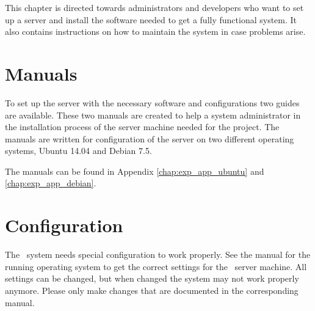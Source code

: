 This chapter is directed towards administrators and developers who want to
set up a server and install the software needed to get a fully functional system.
It also contains instructions on how to maintain the system in case problems arise.
\section{Manuals}
To set up the server with the necessary software and configurations two guides are available. These two manuals are created to help a system administrator in the installation process of the server machine needed for the project. The manuals are written for configuration of the server on two different operating systems, Ubuntu 14.04 and Debian 7.5. 

The manuals can be found in Appendix \ref{chap:exp_app_ubuntu} and \ref{chap:exp_app_debian}.

\section{Configuration}
The \appName\ system needs special configuration to work properly. See the manual for the running operating system to get the correct settings for the \appName\ server machine. All settings can be changed, but when changed the system may not work properly anymore. Please only make changes that are documented in the corresponding manual.
